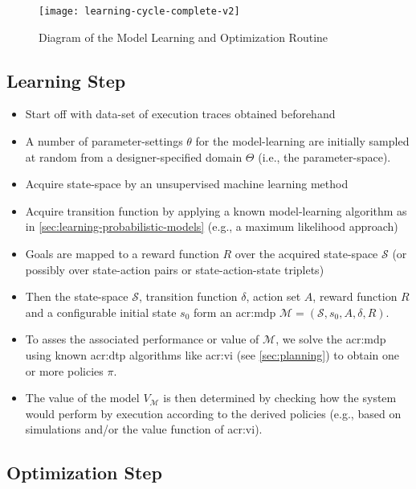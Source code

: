\begin{figure}[!h]%
	\centering
	\texttt{[image: learning-cycle-complete-v2]}
	\caption{Diagram of the Model Learning and Optimization Routine}
	\label{fig:learning-routine-complete}
\end{figure}

\subsection{Learning Step}
\label{sec:routine-description}

\begin{itemize}
	\item Start off with data-set of execution traces obtained beforehand
	\item A number of parameter-settings $\theta$ for the model-learning are initially sampled at random from a designer-specified domain $\Theta$ (i.e., the parameter-space).
	\item Acquire state-space by an unsupervised machine learning method
	\item Acquire transition function by applying a known model-learning algorithm as in \autoref{sec:learning-probabilistic-models} (e.g., a maximum likelihood approach)
	\item Goals are mapped to a reward function $R$ over the acquired state-space $\mathcal{S}$ (or possibly over state-action pairs or state-action-state triplets)
	\item Then the state-space $\mathcal{S}$, transition function $\delta$, action set $A$, reward function $R$ and a configurable initial state $s_0$ form an \acrshort{acr:mdp} $\mathcal{M} = (\mathcal{S}, s_0, A, \delta, R)$.
	\item To asses the associated performance or value of $\mathcal{M}$, we solve the \acrshort{acr:mdp} using known \acrshort{acr:dtp} algorithms like \acrshort{acr:vi} (see \autoref{sec:planning}) to obtain one or more policies $\pi$.
	\item The value of the model $V_\mathcal{M}$ is then determined by checking how the system would perform by execution according to the derived policies (e.g., based on simulations and/or the value function of \acrshort{acr:vi}).
\end{itemize}

\subsection{Optimization Step}
\label{sec:optimization-step}

